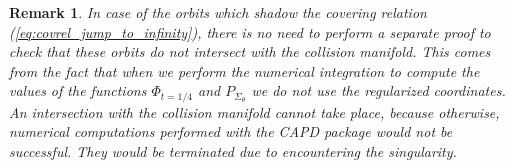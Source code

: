 \documentclass[1p]{article}
\newtheorem{remark}{Remark}
\begin{document}
\begin{remark}
    In case of the orbits which shadow the covering relation (\ref{eq:covrel_jump_to_infinity}), there is no need to perform a separate proof to check that these orbits do not intersect with the collision manifold. This comes from the fact that when we perform the numerical integration to compute the values of the functions $\Phi_{t=1/4}$ and $P_{\Sigma_\theta}$ we do not use the regularized coordinates. An intersection with the collision manifold cannot take place, because otherwise, numerical computations performed with the CAPD package would not be successful. They would be terminated due to encountering the singularity.
\end{remark}

\begin{figure}
    \begin{center}
\end{center}
\end{figure}
\end{document}
